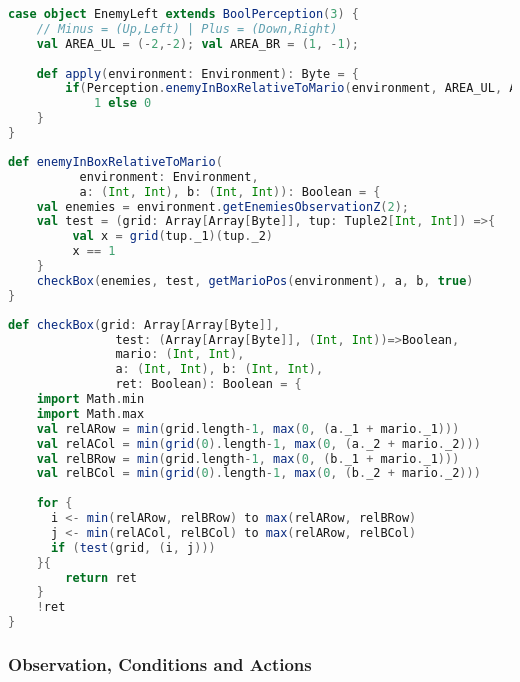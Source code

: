 \begin{minipage}{0.9\linewidth}
\centering
\begin{lstlisting}[language=scala]
case object EnemyLeft extends BoolPerception(3) {
    // Minus = (Up,Left) | Plus = (Down,Right)
    val AREA_UL = (-2,-2); val AREA_BR = (1, -1);
  
    def apply(environment: Environment): Byte = {
        if(Perception.enemyInBoxRelativeToMario(environment, AREA_UL, AREA_BR)) 
            1 else 0  
    }
}
\end{lstlisting}
\end{minipage}

\begin{minipage}{0.9\linewidth}
\centering
\begin{lstlisting}[language=scala]
def enemyInBoxRelativeToMario(
          environment: Environment, 
          a: (Int, Int), b: (Int, Int)): Boolean = {
    val enemies = environment.getEnemiesObservationZ(2);
    val test = (grid: Array[Array[Byte]], tup: Tuple2[Int, Int]) =>{
         val x = grid(tup._1)(tup._2)
         x == 1
    }
    checkBox(enemies, test, getMarioPos(environment), a, b, true)
}
\end{lstlisting}
\end{minipage}

\begin{minipage}{0.9\linewidth}
\centering
\begin{lstlisting}[language=scala]
def checkBox(grid: Array[Array[Byte]], 
               test: (Array[Array[Byte]], (Int, Int))=>Boolean, 
               mario: (Int, Int), 
               a: (Int, Int), b: (Int, Int), 
               ret: Boolean): Boolean = {
    import Math.min
    import Math.max
    val relARow = min(grid.length-1, max(0, (a._1 + mario._1)))
    val relACol = min(grid(0).length-1, max(0, (a._2 + mario._2)))
    val relBRow = min(grid.length-1, max(0, (b._1 + mario._1)))
    val relBCol = min(grid(0).length-1, max(0, (b._2 + mario._2)))
    
    for {
      i <- min(relARow, relBRow) to max(relARow, relBRow)
      j <- min(relACol, relBCol) to max(relARow, relBCol)
      if (test(grid, (i, j)))
    }{
        return ret
    }
    !ret
}
\end{lstlisting}
\end{minipage}


\subsubsection{Observation, Conditions and Actions}

